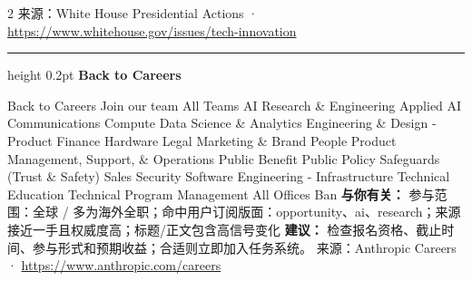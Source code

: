\documentclass[10.5pt]{ctexart}
\begin{document}
\begin{multicols}{2}
{\footnotesize\color{ormuted} 来源：White House Presidential Actions · \url{https://www.whitehouse.gov/issues/tech-innovation}}
\vspace{2mm}
\hrule height 0.2pt
\vspace{2mm}
{\large\bfseries Back to Careers}\par
Back to Careers Join our team All Teams AI Research \& Engineering Applied AI Communications Compute Data Science \& Analytics Engineering \& Design - Product Finance Hardware Legal Marketing \& Brand People Product Management, Support, \& Operations Public Benefit Public Policy Safeguards (Trust \& Safety) Sales Security Software Engineering - Infrastructure Technical Education Technical Program Management All Offices Ban
\textbf{与你有关：} 参与范围：全球 / 多为海外全职；命中用户订阅版面：opportunity、ai、research；来源接近一手且权威度高；标题/正文包含高信号变化
\textbf{建议：} 检查报名资格、截止时间、参与形式和预期收益；合适则立即加入任务系统。
{\footnotesize\color{ormuted} 来源：Anthropic Careers · \url{https://www.anthropic.com/careers}}
\end{multicols}
\end{document}

